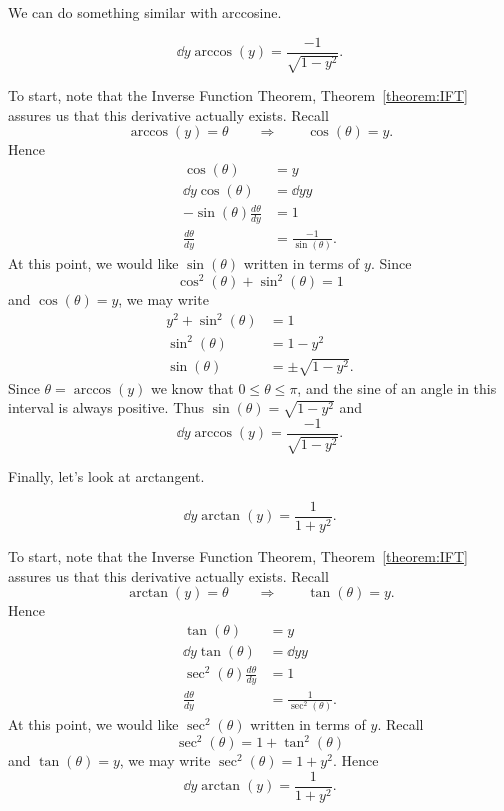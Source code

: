 \documentclass{ximera}
\begin{document}
We can do something similar with arccosine. 

\begin{theorem}
\[
\dd{y} \arccos(y) = \frac{-1}{\sqrt{1-y^2}}.
\]
\begin{explanation} 
To start, note that the Inverse Function Theorem,
Theorem~\ref{theorem:IFT} assures us that this derivative actually
exists.  Recall
\[
\arccos(y) = \theta \qquad\Rightarrow\qquad \cos(\theta) = y.
\]
Hence
\begin{align*}
\cos(\theta) &= y\\
\dd{y} \cos(\theta) &= \dd{y} y \\
-\sin(\theta) \frac{d\theta}{dy} &= 1 \\
\frac{d\theta}{dy} &= \frac{-1}{\sin(\theta)}.
\end{align*}
At this point, we would like $\sin(\theta)$ written in terms of $y$. Since
\[
\cos^2(\theta)+\sin^2(\theta) =1
\]
and $\cos(\theta) = y$, we may write
\begin{align*}
y^2+\sin^2(\theta) &=1\\
\sin^2(\theta) &=1-y^2\\
\sin(\theta) &= \pm \sqrt{1-y^2}.
\end{align*}
Since $\theta=\arccos(y)$ we know that $0\le \theta\le \pi$, and the sine of
an angle in this interval is always positive. Thus
$\sin(\theta)=\sqrt{1-y^2}$ and 
\[
\dd{y} \arccos(y) = \frac{-1}{\sqrt{1-y^2}}.
\]
\end{explanation}
\end{theorem}


Finally, let's look at arctangent.

\begin{theorem}
\[
\dd{y} \arctan(y) = \frac{1}{1+y^2}.
\]
\begin{explanation} 
To start, note that the Inverse Function Theorem,
Theorem~\ref{theorem:IFT} assures us that this derivative actually
exists.  Recall
\[
\arctan(y) = \theta \qquad\Rightarrow\qquad \tan(\theta) = y.
\]
Hence
\begin{align*}
\tan(\theta) &= y\\
\dd{y} \tan(\theta) &= \dd{y} y \\
\sec^2(\theta) \frac{d\theta}{dy} &= 1 \\
\frac{d\theta}{dy} &= \frac{1}{\sec^2(\theta)}.
\end{align*}
At this point, we would like $\sec^2(\theta)$ written in terms of $y$. Recall
\[
\sec^2(\theta) = 1+\tan^2(\theta)
\]
and $\tan(\theta) = y$, we may write $\sec^2(\theta)=1+y^2$. Hence
\[
\dd{y} \arctan(y) = \frac{1}{1+y^2}.
\]
\end{explanation}
\end{theorem}
\end{document}
